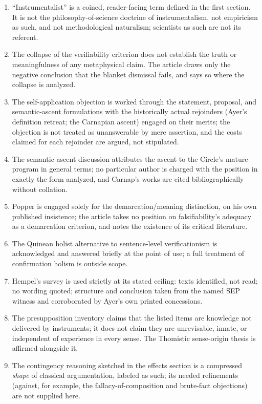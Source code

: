 \begin{enumerate}[leftmargin=1.45em,itemsep=0.25em]
\item ``Instrumentalist'' is a coined, reader-facing term defined in the first section. It is not the philosophy-of-science doctrine of instrumentalism, not empiricism as such, and not methodological naturalism; scientists as such are not its referent.
\item The collapse of the verifiability criterion does not establish the truth or meaningfulness of any metaphysical claim. The article draws only the negative conclusion that the blanket dismissal fails, and says so where the collapse is analyzed.
\item The self-application objection is worked through the statement, proposal, and semantic-ascent formulations with the historically actual rejoinders (Ayer's definition retreat; the Carnapian ascent) engaged on their merits; the objection is not treated as unanswerable by mere assertion, and the costs claimed for each rejoinder are argued, not stipulated.
\item The semantic-ascent discussion attributes the ascent to the Circle's mature program in general terms; no particular author is charged with the position in exactly the form analyzed, and Carnap's works are cited bibliographically without collation.
\item Popper is engaged solely for the demarcation/meaning distinction, on his own published insistence; the article takes no position on falsifiability's adequacy as a demarcation criterion, and notes the existence of its critical literature.
\item The Quinean holist alternative to sentence-level verificationism is acknowledged and answered briefly at the point of use; a full treatment of confirmation holism is outside scope.
\item Hempel's survey is used strictly at its stated ceiling: texts identified, not read; no wording quoted; structure and conclusion taken from the named SEP witness and corroborated by Ayer's own printed concessions.
\item The presupposition inventory claims that the listed items are knowledge not delivered by instruments; it does not claim they are unrevisable, innate, or independent of experience in every sense. The Thomistic sense-origin thesis is affirmed alongside it.
\item The contingency reasoning sketched in the effects section is a compressed \emph{shape} of classical argumentation, labeled as such; its needed refinements (against, for example, the fallacy-of-composition and brute-fact objections) are not supplied here.

\end{enumerate}
